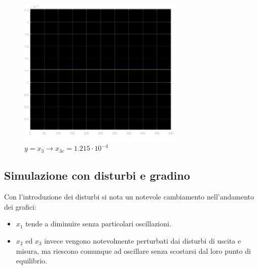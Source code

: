 \documentclass{article}
\begin{document}
\begin{figure}[!h]
    \centering
     \includegraphics[width=0.7\textwidth]{grafici/x3_1.png}
     \caption*{$y=x_3\longrightarrow x_{3e}=1.215\cdot10^{-4}$}
\end{figure}
\newpage
\noindent
\subsection{Simulazione con disturbi e gradino}
Con l'introduzione dei disturbi si nota un notevole cambiamento nell'andamento dei grafici:
\begin{itemize}
    \item $x_1$ tende a diminuire senza particolari oscillazioni.
    \item $x_2$ ed $x_3$ invece vengono notevolmente perturbati dai disturbi di uscita e misura, ma riescono comunque ad oscillare senza scostarsi dal loro punto di equilibrio.
\end{itemize}
\end{document}
